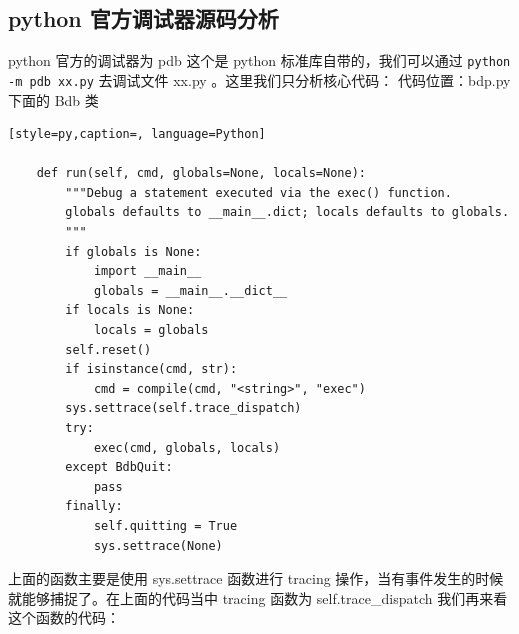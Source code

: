 \subsection{python 官方调试器源码分析}
python 官方的调试器为 pdb 这个是 python 标准库自带的，我们可以通过 \verb|python -m pdb xx.py| 去调试文件 xx.py 。这里我们只分析核心代码：
代码位置：bdp.py 下面的 Bdb 类
\begin{lstlisting}[style=py,caption=, language=Python]

    def run(self, cmd, globals=None, locals=None):
        """Debug a statement executed via the exec() function.
        globals defaults to __main__.dict; locals defaults to globals.
        """
        if globals is None:
            import __main__
            globals = __main__.__dict__
        if locals is None:
            locals = globals
        self.reset()
        if isinstance(cmd, str):
            cmd = compile(cmd, "<string>", "exec")
        sys.settrace(self.trace_dispatch)
        try:
            exec(cmd, globals, locals)
        except BdbQuit:
            pass
        finally:
            self.quitting = True
            sys.settrace(None)
\end{lstlisting}
上面的函数主要是使用 sys.settrace 函数进行 tracing 操作，当有事件发生的时候就能够捕捉了。在上面的代码当中 tracing 函数为 self.trace\_dispatch 我们再来看这个函数的代码：
